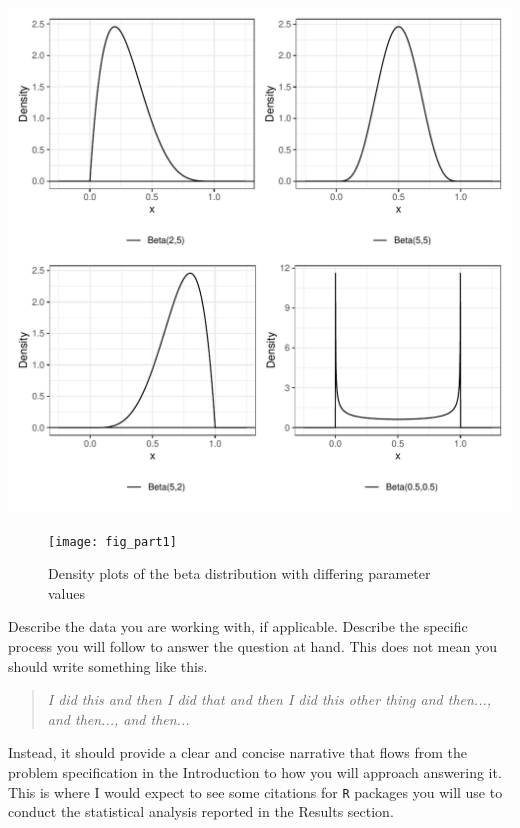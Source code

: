 \documentclass{article}\usepackage[]{graphicx}\usepackage[]{xcolor}
\makeatletter
\def\maxwidth{ %
  \ifdim\Gin@nat@width>\linewidth
    \linewidth
  \else
    \Gin@nat@width
  \fi
}
\newenvironment{knitrout}{}{} %
\makeatother
\begin{document}
\begin{multicols}{2}
\begin{knitrout}
\color{fgcolor}
\includegraphics[width=\maxwidth]{figure/fig_part1-1} 
\end{knitrout}

\begin{figure}[H]
 \begin{center}
 \texttt{[image: fig\_part1]}
 \caption{Density plots of the beta distribution with differing parameter values}
 \label{plot1}
 \end{center}
 \end{figure}






Describe the data you are working with, if applicable. Describe the specific process you will follow to answer the question at hand. This does not mean you should write something like this.
\begin{quote}
\textit{I did this and then I did that and then I did this other thing and then..., and then..., and then...}
\end{quote}
Instead, it should provide a clear and concise narrative that flows from the problem specification in the Introduction to how you will approach answering it. This is where I would expect to see some citations for \texttt{R} packages you will use to conduct the statistical analysis reported in the Results section.



\end{multicols}
\end{document}

